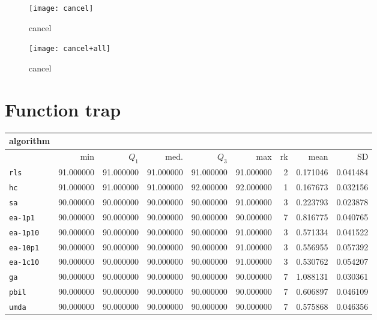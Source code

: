 \begin{center}
\begin{figure}[h]
\centering
\texttt{[image: cancel]}
\caption{cancel}
\end{figure}
\end{center}

\begin{center}
\begin{figure}[h]
\centering
\texttt{[image: cancel+all]}
\caption{cancel}
\end{figure}
\end{center}

\newpage

\section{Function trap}
\begin{center}
\begin{tabular}{@{}l*{5}{>{{}}N{3}{0}}>{{}}N{2}{0}N{1}{3}N{1}{3}@{}}
\toprule
{algorithm} &  &  \\
\midrule
& {min} & {$Q_1$} & {med.} & {$Q_3$} & {max} & {rk} & {mean} & {SD} \\
\midrule
\verb|rls| & {\color{blue}} 91.000000 & {\color{blue}} 91.000000 & {\color{blue}} 91.000000 & 91.000000 & 91.000000 & 2 & 0.171046 & 0.041484 \\
 \verb|hc| & {\color{blue}} 91.000000 & {\color{blue}} 91.000000 & {\color{blue}} 91.000000 & {\color{blue}} 92.000000 & {\color{blue}} 92.000000 & 1 & 0.167673 & 0.032156 \\
 \verb|sa| & 90.000000 & 90.000000 & 90.000000 & 90.000000 & 91.000000 & 3 & 0.223793 & 0.023878 \\
 \verb|ea-1p1| & 90.000000 & 90.000000 & 90.000000 & 90.000000 & 90.000000 & 7 & 0.816775 & 0.040765 \\
 \verb|ea-1p10| & 90.000000 & 90.000000 & 90.000000 & 90.000000 & 91.000000 & 3 & 0.571334 & 0.041522 \\
 \verb|ea-10p1| & 90.000000 & 90.000000 & 90.000000 & 90.000000 & 91.000000 & 3 & 0.556955 & 0.057392 \\
 \verb|ea-1c10| & 90.000000 & 90.000000 & 90.000000 & 90.000000 & 91.000000 & 3 & 0.530762 & 0.054207 \\
 \verb|ga| & 90.000000 & 90.000000 & 90.000000 & 90.000000 & 90.000000 & 7 & 1.088131 & 0.030361 \\
 \verb|pbil| & 90.000000 & 90.000000 & 90.000000 & 90.000000 & 90.000000 & 7 & 0.606897 & 0.046109 \\
 \verb|umda| & 90.000000 & 90.000000 & 90.000000 & 90.000000 & 90.000000 & 7 & 0.575868 & 0.046356 \\
 \bottomrule
\end{tabular}
\end{center}

